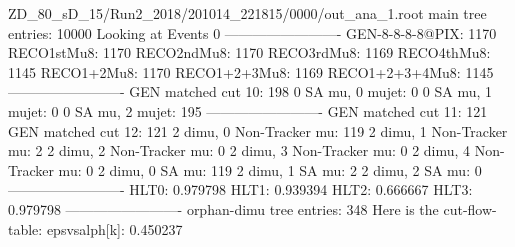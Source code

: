 ZD_80_sD_15/Run2_2018/201014_221815/0000/out_ana_1.root
main tree entries: 10000
Looking at Events 0
-------------------------
GEN-8-8-8-8@PIX: 1170
RECO1stMu8: 1170
RECO2ndMu8: 1170
RECO3rdMu8: 1169
RECO4thMu8: 1145
RECO1+2Mu8: 1170
RECO1+2+3Mu8: 1169
RECO1+2+3+4Mu8: 1145
-------------------------
GEN matched cut 10: 198
0 SA mu, 0 mujet: 0
0 SA mu, 1 mujet: 0
0 SA mu, 2 mujet: 195
-------------------------
GEN matched cut 11: 121
GEN matched cut 12: 121
2 dimu, 0 Non-Tracker mu: 119
2 dimu, 1 Non-Tracker mu: 2
2 dimu, 2 Non-Tracker mu: 0
2 dimu, 3 Non-Tracker mu: 0
2 dimu, 4 Non-Tracker mu: 0
2 dimu, 0 SA mu: 119
2 dimu, 1 SA mu: 2
2 dimu, 2 SA mu: 0
-------------------------
HLT0: 0.979798
HLT1: 0.939394
HLT2: 0.666667
HLT3: 0.979798
-------------------------
orphan-dimu tree entries: 348
Here is the cut-flow-table:
epsvsalph[k]: 0.450237
        
